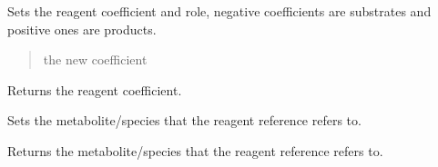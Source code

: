 \documentclass[letterpaper,12pt,english]{sphinxmanual}
\begin{document}
\begin{fulllineitems}
\begin{fulllineitems}
\label{\detokenize{api/core:cbmpy.CBModel.Reagent.setCoefficient}}
\pysigstartsignatures
\pysiglinewithargsret
{}
{}
{}
\pysigstopsignatures
\sphinxAtStartPar
Sets the reagent coefficient and role, negative coefficients are substrates and positive ones are products.
\begin{quote}\begin{description}
\sphinxAtStartPar
{} \textendash{} the new coefficient

\end{description}\end{quote}

\end{fulllineitems}


\begin{fulllineitems}
\label{\detokenize{api/core:cbmpy.CBModel.Reagent.getCoefficient}}
\pysigstartsignatures
\pysiglinewithargsret
{}
{}
{}
\pysigstopsignatures
\sphinxAtStartPar
Returns the reagent coefficient.

\end{fulllineitems}


\begin{fulllineitems}
\label{\detokenize{api/core:cbmpy.CBModel.Reagent.setSpecies}}
\pysigstartsignatures
\pysiglinewithargsret
{}
{}
{}
\pysigstopsignatures
\sphinxAtStartPar
Sets the metabolite/species that the reagent reference refers to.

\end{fulllineitems}


\begin{fulllineitems}
\label{\detokenize{api/core:cbmpy.CBModel.Reagent.getSpecies}}
\pysigstartsignatures
\pysiglinewithargsret
{}
{}
{}
\pysigstopsignatures
\sphinxAtStartPar
Returns the metabolite/species that the reagent reference refers to.


\end{fulllineitems}
\end{fulllineitems}
\end{document}
